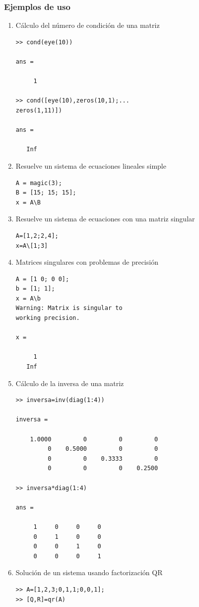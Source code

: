 \documentclass[11pt]{article}
\begin{document}
\subsubsection{Ejemplos de uso}
\begin{multicols}{2}
\begin{enumerate}
\item C\'alculo del n\'umero de condici\'on de una matriz
\begin{verbatim}
>> cond(eye(10))

ans =

     1

>> cond([eye(10),zeros(10,1);...
zeros(1,11)])

ans =

   Inf
\end{verbatim}
\item Resuelve un sistema de ecuaciones lineales simple
\begin{verbatim}
A = magic(3);
B = [15; 15; 15];
x = A\B
\end{verbatim}
%
\item Resuelve un sistema de ecuaciones con una matriz singular
\begin{verbatim}
A=[1,2;2,4];
x=A\[1;3]
\end{verbatim}
%
\item Matrices singulares con problemas de precisi\'on
\begin{verbatim}
A = [1 0; 0 0];
b = [1; 1];
x = A\b
Warning: Matrix is singular to 
working precision. 

x =

     1
   Inf
\end{verbatim}

\item C\'alculo de la inversa de una matriz 
\begin{verbatim}
>> inversa=inv(diag(1:4))

inversa =

    1.0000         0         0         0
         0    0.5000         0         0
         0         0    0.3333         0
         0         0         0    0.2500

>> inversa*diag(1:4)

ans =

     1     0     0     0
     0     1     0     0
     0     0     1     0
     0     0     0     1
\end{verbatim}
\item Soluci\'on de un sistema usando factorizaci\'on QR
\begin{verbatim}
>> A=[1,2,3;0,1,1;0,0,1];
>> [Q,R]=qr(A)


\end{verbatim}
\end{enumerate}
\end{multicols}
\end{document}
